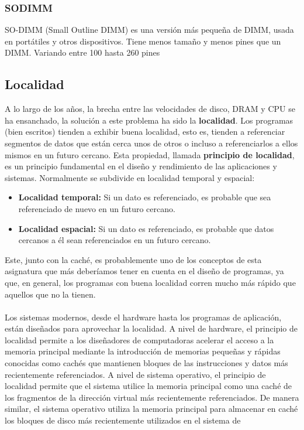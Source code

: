\subsubsection{SODIMM}
SO-DIMM (Small Outline DIMM) es una versión más pequeña de DIMM, usada en portátiles y otros dispositivos. Tiene menos tamaño y menos pines que un DIMM.
Variando entre 100 hasta 260 pines
\subsection{Localidad}
A lo largo de los años, la brecha entre las velocidades de disco, DRAM y CPU se ha ensanchado, 
la solución a este problema ha sido la \textbf{localidad}. Los programas (bien escritos) tienden 
a exhibir buena localidad, esto es, tienden a referenciar segmentos de datos que están cerca unos de otros o incluso a referenciarlos 
a ellos mismos en un futuro cercano. Esta propiedad, llamada \textbf{principio de localidad}, es un principio fundamental en el diseño y rendimiento 
de las aplicaciones y sistemas. Normalmente se subdivide en localidad temporal y espacial:
\begin{itemize}
    \item \textbf{Localidad temporal:} Si un dato es referenciado, es probable que sea referenciado de nuevo en un futuro cercano.
    \item \textbf{Localidad espacial:} Si un dato es referenciado, es probable que datos cercanos a él sean referenciados en un futuro cercano.
\end{itemize}
Este, junto con la caché, es probablemente uno de los conceptos de esta asignatura que más deberíamos tener en cuenta en el diseño de programas, ya que, 
en general, los programas con buena localidad corren mucho más rápido que aquellos que no la tienen.
\\ \\
Los sistemas modernos, desde el hardware hasta los programas de aplicación, están diseñados para aprovechar
la localidad. A nivel de hardware, el principio de localidad permite a los diseñadores 
de computadoras acelerar el acceso a la memoria principal mediante 
la introducción de memorias pequeñas y rápidas conocidas como cachés que mantienen bloques de las instrucciones y datos más recientemente 
referenciados. A nivel de sistema operativo, el principio de localidad permite que el sistema utilice la memoria principal 
como una caché de los fragmentos de la dirección virtual más recientemente referenciados. De manera similar, el sistema 
operativo utiliza la memoria principal para almacenar en caché los bloques de disco más recientemente utilizados en el sistema de 
